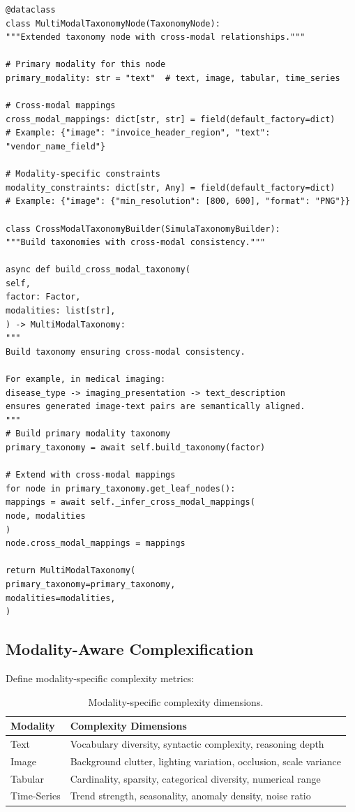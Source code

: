 \documentclass[12pt,a4paper,twoside]{report}
\begin{document}
\begin{lstlisting}[language=jsonx,caption={Cross-modal taxonomy extension.}]
@dataclass
class MultiModalTaxonomyNode(TaxonomyNode):
"""Extended taxonomy node with cross-modal relationships."""

# Primary modality for this node
primary_modality: str = "text"  # text, image, tabular, time_series

# Cross-modal mappings
cross_modal_mappings: dict[str, str] = field(default_factory=dict)
# Example: {"image": "invoice_header_region", "text": "vendor_name_field"}

# Modality-specific constraints
modality_constraints: dict[str, Any] = field(default_factory=dict)
# Example: {"image": {"min_resolution": [800, 600], "format": "PNG"}}

class CrossModalTaxonomyBuilder(SimulaTaxonomyBuilder):
"""Build taxonomies with cross-modal consistency."""

async def build_cross_modal_taxonomy(
self,
factor: Factor,
modalities: list[str],
) -> MultiModalTaxonomy:
"""
Build taxonomy ensuring cross-modal consistency.

For example, in medical imaging:
disease_type -> imaging_presentation -> text_description
ensures generated image-text pairs are semantically aligned.
"""
# Build primary modality taxonomy
primary_taxonomy = await self.build_taxonomy(factor)

# Extend with cross-modal mappings
for node in primary_taxonomy.get_leaf_nodes():
mappings = await self._infer_cross_modal_mappings(
node, modalities
)
node.cross_modal_mappings = mappings

return MultiModalTaxonomy(
primary_taxonomy=primary_taxonomy,
modalities=modalities,
)
\end{lstlisting}

\subsection{Modality-Aware Complexification}

Define modality-specific complexity metrics:

\begin{table}[htbp]
\centering
\caption{Modality-specific complexity dimensions.}
\label{tab:modality-complexity}
\footnotesize
\begin{tabularx}{\textwidth}{@{}l X@{}}
\toprule
\textbf{Modality} & \textbf{Complexity Dimensions} \\
\midrule
Text & Vocabulary diversity, syntactic complexity, reasoning depth \\
Image & Background clutter, lighting variation, occlusion, scale variance \\
Tabular & Cardinality, sparsity, categorical diversity, numerical range \\
Time-Series & Trend strength, seasonality, anomaly density, noise ratio \\
\bottomrule
\end{tabularx}
\end{table}
\end{document}
